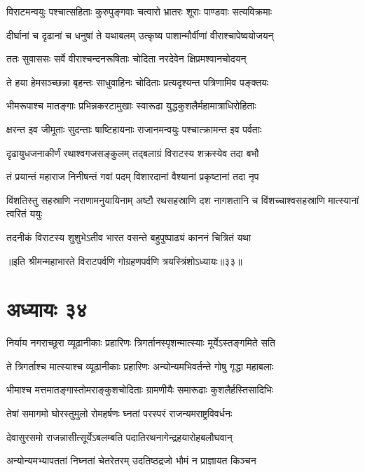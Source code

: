 \twolineshloka
{विराटमन्वयुः पश्चात्सहिताः कुरुपुङ्गवाः}
{चत्वारो भ्रातरः शूराः पाण्डवाः सत्यविक्रमाः}


\twolineshloka
{दीर्घानां च दृढानां च धनुषां ते यथाबलम्}
{उत्कृष्य पाशान्मौर्वीणां वीराश्चापेष्वयोजयन्}


\twolineshloka
{ततः सुवाससः सर्वे वीराश्चन्दनरूषिताः}
{चोदिता नरदेवेन क्षिप्रमश्वानचोदयन्}


\twolineshloka
{ते हया हेमसञ्च्छन्ना बृहन्तः साधुवाहिनः}
{चोदिताः प्रत्यदृश्यन्त पत्रिणामिव पङ्क्तयः}


\twolineshloka
{भीमरूपाश्च मातङ्गाः प्रभिन्नकरटामुखाः}
{स्वारूढा युद्धकुशलैर्महामात्राधिरोहिताः}


\twolineshloka
{क्षरन्त इव जीमूताः सुदन्ताः षाष्टिहायनाः}
{राजानमन्वयुः पश्चात्क्रामन्त इव पर्वताः}


\twolineshloka
{दृढायुधजनाकीर्णं रथाश्वगजसङ्कुलम्}
{तद्बलाग्रं विराटस्य शक्रस्येव तदा बभौ}


\twolineshloka
{तं प्रयान्तं महाराज निनीषन्तं गवां पदम्}
{विशारदानां वैश्यानां प्रकृष्टानां तदा नृप}


\threelineshloka
{विंशतिस्तु सहस्राणि नराणामनुयायिनाम्}
{अष्टौ रथसहस्राणि दश नागशतानि च}
{विंशच्चाश्वसहस्राणि मात्स्यानां त्वरितं ययुः}


\twolineshloka
{तदनीकं विराटस्य शुशुभेऽतीव भारत}
{वसन्ते बहुपुष्पाढ्यं काननं चित्रितं यथा}

॥इति श्रीमन्महाभारते विराटपर्वणि गोग्रहणपर्वणि त्रयस्त्रिंशोऽध्यायः॥३३॥

\chapter{अध्यायः ३४}

\twolineshloka
{निर्याय नगराच्छूरा व्यूढानीकाः प्रहारिणः}
{त्रिगर्तानस्पृशन्मात्स्याः मूर्येऽस्तङ्गमिते सति}


\twolineshloka
{ते त्रिगर्ताश्च मात्स्याश्च व्यूढानीकाः प्रहारिणः}
{अन्योन्यमभिवर्तन्ते गोषु गृद्धा महाबलाः}


\twolineshloka
{भीमाश्च मत्तमातङ्गास्तोमराङ्कुशचोदिताः}
{ग्रामणीयैः समारूढाः कुशलैर्हस्तिसादिभिः}


\twolineshloka
{तेषां समागमो घोरस्तुमुलो रोमहर्षणः}
{घ्नतां परस्परं राजन्यमराष्ट्रविवर्धनः}


\twolineshloka
{देवासुरसमो राजन्नासीत्सूर्येऽबलम्बति}
{पदातिरथनागेन्द्रहयारोहबलौघवान्}


\twolineshloka
{अन्योन्यमभ्यापततां निघ्नतां चेतरेतरम्}
{उदतिष्ठद्रजो भौमं न प्राज्ञायत किञ्चन}


